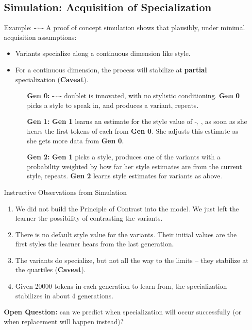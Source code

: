 \documentclass[hyperref={pdfpagelabels=false}]{beamer}
\begin{document}
\subsection{Simulation: Acquisition of Specialization}
\begin{frame}{Example: -$\sim$-}
	A proof of concept simulation shows that plausibly, under minimal acquisition assumptions:
	\begin{itemize}
	\item Variants specialize along a continuous dimension like style.
	\item For a continuous dimension, the process will stabilize at \textbf{partial} specialization (\textbf{Caveat}). 
	\item[ ] \begin{itemize}
		\item[\textbf{Gen 0:}]  -$\sim$- doublet is innovated, with no stylistic conditioning. \textbf{Gen 0} picks a style to speak in, and produces a variant, repeats. 
		\item[\textbf{Gen 1:}]  \textbf{Gen 1} learns an estimate for the style value of -, , as soon as she hears the first tokens of each from \textbf{Gen 0}. She adjusts this estimate as she gets more data from \textbf{Gen 0}.
		\item[\textbf{Gen 2:}] \textbf{Gen 1} picks a style, produces one of the variants with a probability weighted by how far her style estimates are from the current style, repeats. \textbf{Gen 2} learns style estimates for variants as above.
	\end{itemize}
	\end{itemize}
\end{frame}


%

\begin{frame}{Instructive Observations from Simulation}
\begin{enumerate}
	\item We did not build the Principle of Contrast into the model. We just left the learner the possibility of contrasting the variants.
	\item There is no default style value for the variants. Their initial values are the first styles the learner hears from the last generation.
	\item The variants do specialize, but not all the way to the limits -- they stabilize at the quartiles (\textbf{Caveat}).
	\item Given 20000 tokens in each generation to learn from, the specialization stabilizes in about 4 generations.%
\end{enumerate}
	\textbf{Open Question:} can we predict when specialization will occur successfully (or when replacement will happen instead)?
\end{frame}
\end{document}
